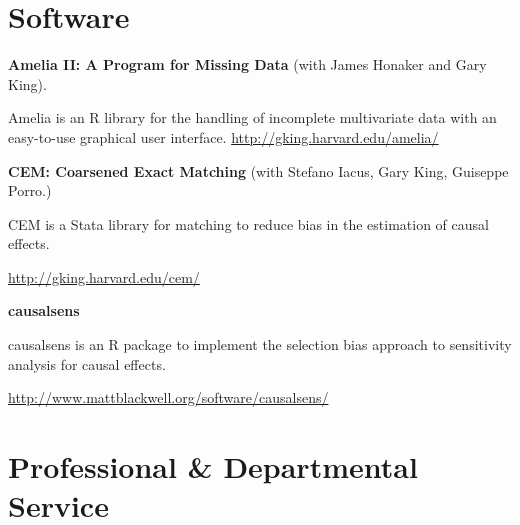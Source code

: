 \documentclass[margin,line]{res}
\newenvironment{list1}{
  \begin{list}{\ding{113}}{%
      \setlength{\itemsep}{0in}
      \setlength{\parsep}{0in} \setlength{\parskip}{0in}
      \setlength{\topsep}{0in} \setlength{\partopsep}{0in} 
      \setlength{\leftmargin}{0.83 cm}}}{\end{list}}
\begin{document}
\begin{resume}
\section{\sc Software}
{\bf Amelia II: A Program for Missing Data} (with James Honaker and Gary
King). 
\begin{list1}
\item[] Amelia is an R library for the handling of incomplete multivariate
  data with an easy-to-use graphical user
  interface. \url{http://gking.harvard.edu/amelia/} 
\end{list1}
{\bf CEM: Coarsened Exact Matching} (with Stefano Iacus, Gary
King, Guiseppe  Porro.)
\begin{list1}
\item[] CEM is a Stata library for matching to reduce bias in the estimation of
  causal effects. 
\item[] \url{http://gking.harvard.edu/cem/}
\end{list1}
{\bf causalsens} 
\begin{list1}
\item[] causalsens is an R package to implement the selection bias approach to sensitivity analysis for causal effects.
\item[] \url{http://www.mattblackwell.org/software/causalsens/}
\end{list1}


\section{\sc Professional \& Departmental Service}


\end{resume}
\end{document}
